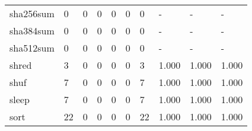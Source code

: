 \begin{longtable}{lp{2.0cm}p{2.0cm}p{2.0cm}p{2.0cm}p{2.0cm}p{2.0cm}p{2.0cm}p{2.0cm}p{2.0cm}}
sha256sum &                      0 &                                  0 &                                 0 &                                0 &                                 0 &                               0 &                                    - &                                      - &                                    - \\
sha384sum &                      0 &                                  0 &                                 0 &                                0 &                                 0 &                               0 &                                    - &                                      - &                                    - \\
sha512sum &                      0 &                                  0 &                                 0 &                                0 &                                 0 &                               0 &                                    - &                                      - &                                    - \\
shred     &                      3 &                                  0 &                                 0 &                                0 &                                 0 &                               3 &                                1.000 &                                  1.000 &                                1.000 \\
shuf      &                      7 &                                  0 &                                 0 &                                0 &                                 0 &                               7 &                                1.000 &                                  1.000 &                                1.000 \\
sleep     &                      7 &                                  0 &                                 0 &                                0 &                                 0 &                               7 &                                1.000 &                                  1.000 &                                1.000 \\
sort      &                     22 &                                  0 &                                 0 &                                0 &                                 0 &                              22 &                                1.000 &                                  1.000 &                                1.000 \\

\end{longtable}
